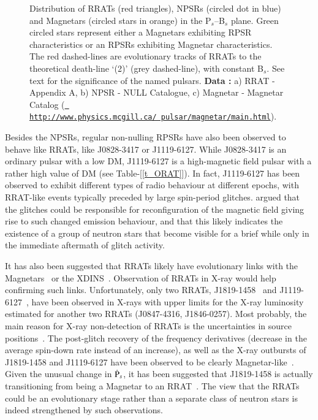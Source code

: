 \documentclass{jaa}
\newcommand{\psdot}{\mbox{$\dot{\rm P}_s$}}
\begin{document}
%
\begin{figure*} 
% 
%  
\caption{Distribution of RRATs (red  triangles), NPSRs (circled dot in
  blue) and  Magnetars (circled stars  in orange) in  the P$_s$--B$_s$
  plane.  Green  circled stars  represent either a Magnetars exhibiting
  RPSR  characteristics or an RPSRs exhibiting Magnetar characteristics.
  The  red  dashed-lines  are  evolutionary tracks  of  RRATs  to  the
  theoretical  death-line  `(2)'  (grey  dashed-line),  with  constant
  B$_s$.  See  text for the  significance of the named  pulsars.  {\bf
    Data  :} a)  RRAT  - Appendix  A,  b) NPSR  -  NULL Catalogue,  c)
  Magnetar       -        Magnetar       Catalog       (\underline{\tt
    http://www.physics.mcgill.ca/~pulsar/magnetar/main.html}).}
%
\label{f_bp-death} 
%
\end{figure*}
%

Besides the NPSRs,  regular non-nulling RPSRs have  also been observed
to behave like RRATs, like J0828-3417 or J1119-6127.  While J0828-3417
is an  ordinary pulsar with  a low  DM, J1119-6127 is  a high-magnetic
field   pulsar    with   a    rather   high    value   of    DM   (see
Table-[\ref{t_ORAT}]). In fact, J1119-6127 has been observed to exhibit
different types of radio behaviour at different epochs, with RRAT-like
events   typically    preceded   by   large    spin-period   glitches.
  argued that  the  glitches could  be responsible  for
reconfiguration of  the magnetic  field giving  rise to  such changed
emission behaviour, and that this  likely indicates the existence of a
group of neutron  stars that become visible for a  brief while only in
the immediate aftermath of glitch activity.

It has also  been suggested that RRATs likely  have evolutionary links
with   the  Magnetars~\cite{mclau09}   or  the   XDINS~\cite{popov06}.
Observation  of  RRATs in  X-ray  would  help confirming  such  links.
Unfortunately,   only   two   RRATs,   J1819-1458~\cite{mclau07}   and
J1119-6127~\cite{archi17},  have been  observed in  X-rays with  upper
limits  for  the X-ray  luminosity  estimated  for another  two  RRATs
(J0847-4316, J1846-0257).   Most probably,  the main reason  for X-ray
non-detection   of    RRATs   is    the   uncertainties    in   source
positions~\cite{kapla09b}.  The post-glitch  recovery of the frequency
derivatives  (decrease in  the average  spin-down rate  instead of  an
increase), as well as the X-ray outbursts of J1819-1458 and J1119-6127
have         been        observed         to        be         clearly
Magnetar-like~\cite{lyne09,rea10,archi17,bhatt18}.  Given  the unusual
change in \psdot, it has been suggested that J1819-1458 is actually
transitioning  from being  a Magnetar  to an  RRAT~\cite{lyne09}.  The
view  that the  RRATs could  be an  evolutionary stage  rather than  a
separate  class  of  neutron  stars is  indeed  strengthened  by  such
observations.
\end{document}
